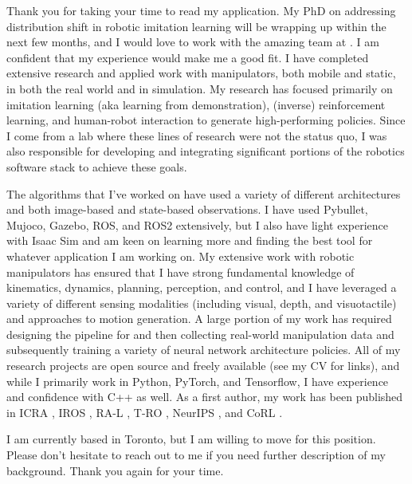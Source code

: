 Thank you for taking your time to read my application. 
My PhD on addressing distribution shift in robotic imitation learning will be wrapping up within the next few months, and I would love to work with the amazing team at \company. 
I am confident that my experience would make me a good fit. 
I have completed extensive research and applied work with manipulators, both mobile and static, in both the real world and in simulation. 
My research has focused primarily on imitation learning (aka learning from demonstration), (inverse) reinforcement learning, and human-robot interaction to generate high-performing policies.
Since I come from a lab where these lines of research were not the status quo, I was also responsible for developing and integrating significant portions of the robotics software stack to achieve these goals.

The algorithms that I’ve worked on have used a variety of different architectures and both image-based and state-based observations. 
I have used Pybullet, Mujoco, Gazebo, ROS, and ROS2 extensively, but I also have light experience with Isaac Sim and am keen on learning more and finding the best tool for whatever application I am working on.
My extensive work with robotic manipulators has ensured that I have strong fundamental knowledge of kinematics, dynamics, planning, perception, and control, and I have leveraged a variety of different sensing modalities (including visual, depth, and visuotactile) and approaches to motion generation.
A large portion of my work has required designing the pipeline for and then collecting real-world manipulation data and subsequently training a variety of neural network architecture policies.
All of my research projects are open source and freely available (see my CV for links), and while I primarily work in Python, PyTorch, and Tensorflow, I have experience and confidence with C++ as well.
As a first author, my work has been published in ICRA \cite{2024_Ablett_vpace}, IROS \cite{ablettSeeingAllAngles2021}, RA-L \cite{2023_Ablett_Learning}, T-RO \cite{2024_Ablett_Push}, NeurIPS \cite{2021_Ablett_Learning}, and CoRL \cite{ablettFastReinforcementLearning2024}.

I am currently based in Toronto, but I am willing to move for this position. Please don’t hesitate to reach out to me if you need further description of my background. Thank you again for your time.
